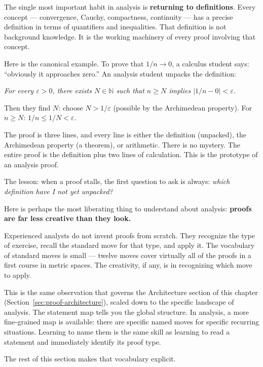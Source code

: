 \begin{remark}
The single most important habit in analysis is \textbf{returning to
definitions}. Every concept --- convergence, Cauchy, compactness,
continuity --- has a precise definition in terms of quantifiers and
inequalities. That definition is not background knowledge. It is the
working machinery of every proof involving that concept.

Here is the canonical example. To prove that $1/n \to 0$, a calculus
student says: ``obviously it approaches zero.'' An analysis student
unpacks the definition:

\medskip
\noindent\textit{For every $\varepsilon > 0$, there exists $N \in \mathbb{N}$
such that $n \geq N$ implies $|1/n - 0| < \varepsilon$.}

\medskip
\noindent Then they find $N$: choose $N > 1/\varepsilon$ (possible by
the Archimedean property). For $n \geq N$: $1/n \leq 1/N < \varepsilon$.

The proof is three lines, and every line is either the definition
(unpacked), the Archimedean property (a theorem), or arithmetic.
There is no mystery. The entire proof is the definition plus two lines
of calculation. This is the prototype of an analysis proof.

The lesson: when a proof stalls, the first question to ask is always:
\emph{which definition have I not yet unpacked?}
\end{remark}

\begin{remark}
Here is perhaps the most liberating thing to understand about analysis:
\textbf{proofs are far less creative than they look.}

Experienced analysts do not invent proofs from scratch. They recognize
the type of exercise, recall the standard move for that type, and apply
it. The vocabulary of standard moves is small --- twelve moves cover
virtually all of the proofs in a first course in metric spaces. The
creativity, if any, is in recognizing which move to apply.

This is the same observation that governs the Architecture section of
this chapter (Section~\ref{sec:proof-architecture}), scaled down to the
specific landscape of analysis. The statement map tells you the global
structure. In analysis, a more fine-grained map is available: there are
specific named moves for specific recurring situations. Learning to
name them is the same skill as learning to read a statement and
immediately identify its proof type.

The rest of this section makes that vocabulary explicit.
\end{remark}
